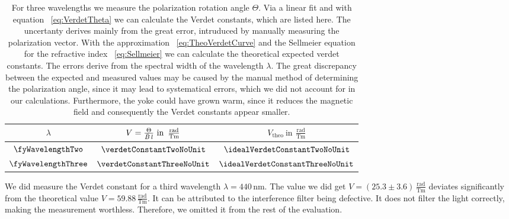 \documentclass[a4paper,10pt,twocolumn]{article}
\newcommand{\unit}[1]{\, \mathrm{#1}}
\newcommand{\nm}{\unit{nm}}
\newcommand{\unitVerdet}{\unit{\frac{rad}{T m}}}
\begin{document}
    \newcommand{\VTheo}{V_{\mathrm{theo}}}
    \renewcommand{\arraystretch}{1.5}
    \begin{table}[h!]
        \centering
        \begin{tabular}{ c c c }
            \hline \hline 
            $\lambda$ & $V = \frac{\Theta}{\BMean \, l} \ \text{in} \ \unitVerdet$ & $\VTheo \ \text{in} \ \unitVerdet$\\ 
            \hline
            $\fyWavelengthTwo$ & $\verdetConstantTwoNoUnit$ & $\idealVerdetConstantTwoNoUnit$ \\
            $\fyWavelengthThree$ & $\verdetConstantThreeNoUnit$ & $\idealVerdetConstantThreeNoUnit$ \\ 
            \hline \hline
            
        \end{tabular}
        \caption{
            For three wavelengths we measure the polarization rotation angle $\Theta$.
            Via a linear fit and with equation ~\eqref{eq:VerdetTheta} 
            we can calculate the Verdet constants, which are listed here.
            The uncertanty derives mainly from the great error, intruduced by manually measuring the
            polarization vector.
            With the approximation ~\eqref{eq:TheoVerdetCurve} and the Sellmeier equation for the
            refractive index ~\eqref{eq:Sellmeier} we can calculate the theoretical expected verdet
            constants.
            The errors derive from the spectral width of the wavelength $\lambda$.
            The great discrepancy between the expected and measured values
            may be caused by the manual method of determining the polarization angle, since
            it may lead to systematical errors, which we did not account for in our calculations.
            Furthermore, the yoke could have grown warm, since it reduces the magnetic field
            and consequently the Verdet constants appear smaller.
        }
        \label{tab:verdetConstants}
    \end{table}
    
    We did measure the Verdet constant for a third wavelength $\lambda = 440 \nm$.
    The value we did get $V = (25.3 \pm 3.6) \unitVerdet$ deviates significantly from the theoretical value 
    $V = 59.88 \unitVerdet$.
    It can be attributed to the interference filter being defective.
    It does not filter the light correctly, making the measurement worthless.
    Therefore, we omitted it from the rest of the evaluation.
    
\end{document}
